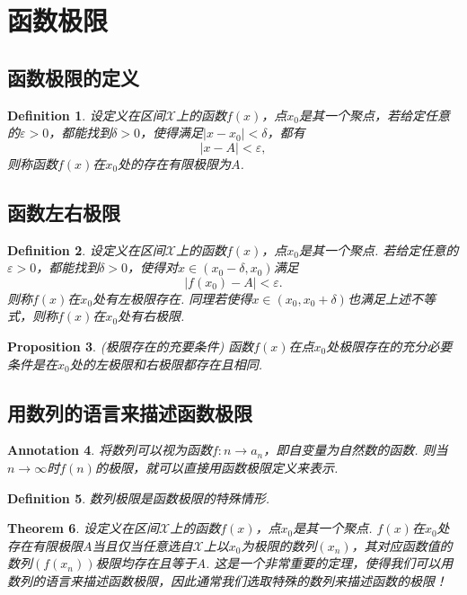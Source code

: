 \documentclass{article}
\newtheorem{theorem}{Theorem}[section]
\newtheorem{proposition}[theorem]{Proposition}
\newtheorem{definition}[theorem]{Definition}
\newtheorem{annotation}[theorem]{Annotation}
\begin{document}
\newpage
\section{函数极限}

\subsection{函数极限的定义}

\begin{definition}
\rm 设定义在区间$\mathcal{X}$上的函数$f(x)$，点$x_0$是其一个聚点，若给定任意的$\varepsilon  > 0$，都能找到$\delta > 0$，使得满足$|x-x_0| < \delta$，都有
$$
|x-A| < \varepsilon,
$$
则称函数$f(x)$在$x_0$处的存在有限极限为$A$.
\end{definition}

\subsection{函数左右极限}
\begin{definition}
\rm 设定义在区间$\mathcal{X}$上的函数$f(x)$，点$x_0$是其一个聚点. 若给定任意的$\varepsilon > 0$，都能找到$\delta > 0$，使得对$x \in (x_0-\delta,x_0)$满足
$$
|f(x_0)-A| < \varepsilon.
$$
则称$f(x)$在$x_0$处有{\color{red}左极限}存在. 同理若使得$x \in (x_0,x_0 +\delta)$也满足上述不等式，则称$f(x)$在$x_0$处有{\color{red}右极限}.
\end{definition}

\begin{proposition}
\rm {\color{red} (极限存在的充要条件) }函数$f(x)$在点$x_0$处极限存在的充分必要条件是在$x_0$处的左极限和右极限都存在且相同.
\end{proposition}

\subsection{用数列的语言来描述函数极限}

\begin{annotation}
\rm  将数列可以视为函数$f : n \to a_n$，即自变量为自然数的函数. 则当$n \to \infty$时$f(n)$的极限，就可以直接用函数极限定义来表示.  
\end{annotation}

\begin{definition}
\rm 数列极限是函数极限的特殊情形. 
\end{definition}

\begin{theorem}\label{func-limit: Heine}
\rm 设定义在区间$\mathcal{X}$上的函数$f(x)$，点$x_0$是其一个聚点. $f(x)$在$x_0$处存在有限极限$A$当且仅当任意选自$\mathcal{X}$上以$x_0$为极限的数列$(x_n)$，其对应函数值的数列$(f(x_n))$极限均存在且等于$A$. {\color{red} 这是一个非常重要的定理，使得我们可以用数列的语言来描述函数极限，因此通常我们选取特殊的数列来描述函数的极限！}
\end{theorem}
\end{document}
